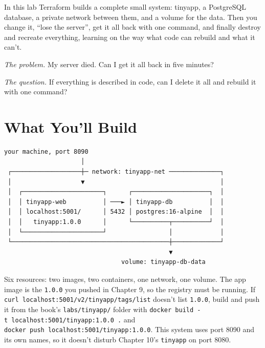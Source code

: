 
\begin{chapterintro}

In this lab Terraform builds a complete small system: tinyapp, a PostgreSQL database, a private network between them, and a volume for the data. Then you change it, ``lose the server'', get it all back with one command, and finally destroy and recreate everything, learning on the way what code can rebuild and what it can't.

\end{chapterintro}

\emph{The problem.} My server died. Can I get it all back in five minutes?

\emph{The question.} If everything is described in code, can I delete it all and rebuild it with one command?

\section{What You'll Build}\label{11-lab-rebuild-everything-from-code:what-youll-build}

\begin{codeblock}
\begin{Verbatim}[breaklines=false, fontsize=\fontsize{8.8}{8.68}\selectfont, fontfamily=diagrammono, formatcom=\diagramlines]
            your machine, port 8090
                     │
 ┌───────────────────┼─ network: tinyapp-net ──────────────┐
 │                   ▼                                     │
 │  ┌──────────────────────┐      ┌─────────────────────┐  │
 │  │ tinyapp-web          │ ───► │ tinyapp-db          │  │
 │  │ localhost:5001/      │ 5432 │ postgres:16-alpine  │  │
 │  │   tinyapp:1.0.0      │      └──────────┬──────────┘  │
 │  └──────────────────────┘                 │             │
 └───────────────────────────────────────────┼─────────────┘
                                             ▼
                                volume: tinyapp-db-data
\end{Verbatim}
\end{codeblock}

Six resources: two images, two containers, one network, one volume. The app image is the \texttt{1.0.0} you pushed in Chapter 9, so the registry must be running. If \texttt{curl\ localhost:}\allowbreak{}\texttt{5001/}\allowbreak{}\texttt{v2/}\allowbreak{}\texttt{tinyapp/}\allowbreak{}\texttt{tags/}\allowbreak{}\texttt{list} doesn't list \texttt{1.0.0}, build and push it from the book's \texttt{labs/tinyapp/} folder with \texttt{docker\ build\ -}\allowbreak{}\texttt{t\ localhost:}\allowbreak{}\texttt{5001/}\allowbreak{}\texttt{tinyapp:}\allowbreak{}\texttt{1.}\allowbreak{}\texttt{0.}\allowbreak{}\texttt{0\ .} and \texttt{docker\ push\ localhost:}\allowbreak{}\texttt{5001/}\allowbreak{}\texttt{tinyapp:}\allowbreak{}\texttt{1.}\allowbreak{}\texttt{0.}\allowbreak{}\texttt{0}. This system uses port 8090 and its own names, so it doesn't disturb Chapter 10's \texttt{tinyapp} on port 8080.

